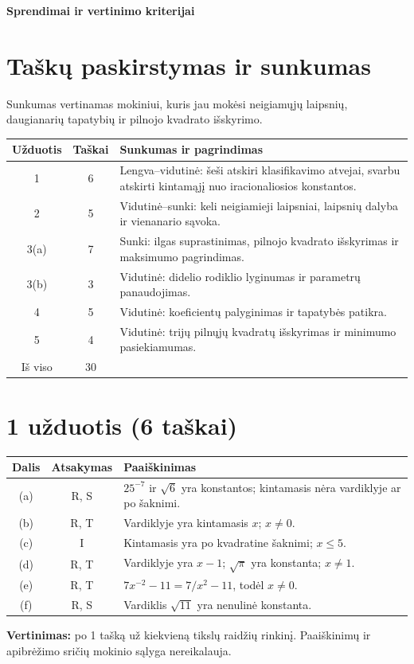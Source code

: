 \documentclass[12pt,a4paper]{exam}
\begin{document}
\begin{center}\Large\textbf{Sprendimai ir vertinimo kriterijai}\end{center}
\section*{Taškų paskirstymas ir sunkumas}
Sunkumas vertinamas mokiniui, kuris jau mokėsi neigiamųjų laipsnių, daugianarių tapatybių ir pilnojo kvadrato išskyrimo.
\begin{center}\begin{tabular}{|c|c|p{10cm}|}\hline
Užduotis & Taškai & Sunkumas ir pagrindimas\\\hline
1 & 6 & Lengva--vidutinė: šeši atskiri klasifikavimo atvejai, svarbu atskirti kintamąjį nuo iracionaliosios konstantos.\\\hline
2 & 5 & Vidutinė--sunki: keli neigiamieji laipsniai, laipsnių dalyba ir vienanario sąvoka.\\\hline
3(a) & 7 & Sunki: ilgas suprastinimas, pilnojo kvadrato išskyrimas ir maksimumo pagrindimas.\\\hline
3(b) & 3 & Vidutinė: didelio rodiklio lyginumas ir parametrų panaudojimas.\\\hline
4 & 5 & Vidutinė: koeficientų palyginimas ir tapatybės patikra.\\\hline
5 & 4 & Vidutinė: trijų pilnųjų kvadratų išskyrimas ir minimumo pasiekiamumas.\\\hline
Iš viso & 30 & \\\hline
\end{tabular}\end{center}
\section*{1 užduotis (6 taškai)}
\begin{center}\begin{tabular}{|c|c|p{11cm}|}\hline
Dalis & Atsakymas & Paaiškinimas\\\hline
(a) & R, S & $25^{-7}$ ir $\sqrt6$ yra konstantos; kintamasis nėra vardiklyje ar po šaknimi.\\\hline
(b) & R, T & Vardiklyje yra kintamasis $x$; $x\ne0$.\\\hline
(c) & I & Kintamasis yra po kvadratine šaknimi; $x\leq5$.\\\hline
(d) & R, T & Vardiklyje yra $x-1$; $\sqrt\pi$ yra konstanta; $x\ne1$.\\\hline
(e) & R, T & $7x^{-2}-11=7/x^2-11$, todėl $x\ne0$.\\\hline
(f) & R, S & Vardiklis $\sqrt{11}$ yra nenulinė konstanta.\\\hline
\end{tabular}\end{center}
\textbf{Vertinimas:} po 1 tašką už kiekvieną tikslų raidžių rinkinį. Paaiškinimų ir apibrėžimo sričių mokinio sąlyga nereikalauja.
\end{document}
